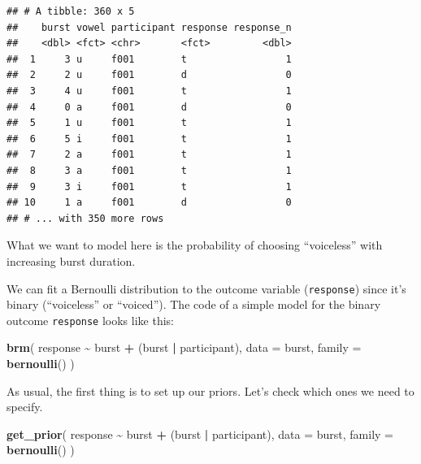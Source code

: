 \documentclass[
]{article}
\newenvironment{Shaded}{\begin{snugshade}}{\end{snugshade}}
\newcommand{\DataTypeTok}[1]{\textcolor[rgb]{0.13,0.29,0.53}{#1}}
\newcommand{\KeywordTok}[1]{\textcolor[rgb]{0.13,0.29,0.53}{\textbf{#1}}}
\newcommand{\NormalTok}[1]{#1}
\newcommand{\OperatorTok}[1]{\textcolor[rgb]{0.81,0.36,0.00}{\textbf{#1}}}
\newcommand{\StringTok}[1]{\textcolor[rgb]{0.31,0.60,0.02}{#1}}
\begin{document}
\begin{verbatim}
## # A tibble: 360 x 5
##    burst vowel participant response response_n
##    <dbl> <fct> <chr>       <fct>         <dbl>
##  1     3 u     f001        t                 1
##  2     2 u     f001        d                 0
##  3     4 u     f001        t                 1
##  4     0 a     f001        d                 0
##  5     1 u     f001        t                 1
##  6     5 i     f001        t                 1
##  7     2 a     f001        t                 1
##  8     3 a     f001        t                 1
##  9     3 i     f001        t                 1
## 10     1 a     f001        d                 0
## # ... with 350 more rows
\end{verbatim}

What we want to model here is the probability of choosing ``voiceless''
with increasing burst duration.

We can fit a Bernoulli distribution to the outcome variable
(\texttt{response}) since it's binary (``voiceless'' or ``voiced''). The
code of a simple model for the binary outcome \texttt{response} looks
like this:

\begin{Shaded}
\begin{Highlighting}[]
\KeywordTok{brm}\NormalTok{(}
\NormalTok{  response }\OperatorTok{\textasciitilde{}}
\StringTok{    }\NormalTok{burst }\OperatorTok{+}
\StringTok{    }\NormalTok{(burst }\OperatorTok{|}\StringTok{ }\NormalTok{participant),}
  \DataTypeTok{data =}\NormalTok{ burst,}
  \DataTypeTok{family =} \KeywordTok{bernoulli}\NormalTok{()}
\NormalTok{)}
\end{Highlighting}
\end{Shaded}

As usual, the first thing is to set up our priors. Let's check which
ones we need to specify.

\begin{Shaded}
\begin{Highlighting}[]
\KeywordTok{get\_prior}\NormalTok{(}
\NormalTok{  response }\OperatorTok{\textasciitilde{}}
\StringTok{    }\NormalTok{burst }\OperatorTok{+}
\StringTok{    }\NormalTok{(burst }\OperatorTok{|}\StringTok{ }\NormalTok{participant),}
  \DataTypeTok{data =}\NormalTok{ burst,}
  \DataTypeTok{family =} \KeywordTok{bernoulli}\NormalTok{()}
\NormalTok{)}
\end{Highlighting}
\end{Shaded}
\end{document}
